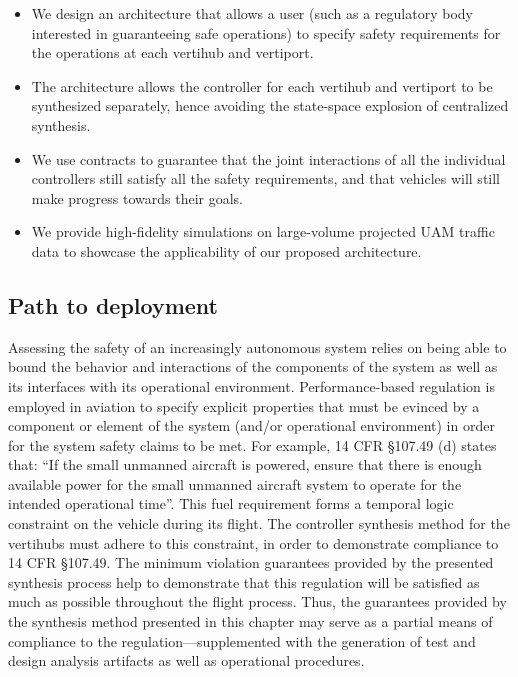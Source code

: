 \begin{itemize}
	\item We design an architecture that allows a user (such as a regulatory body interested in guaranteeing safe operations) to specify safety requirements for the operations at each vertihub and vertiport. 
	\item The architecture allows the controller for each vertihub and vertiport to be synthesized separately, hence avoiding the state-space explosion of centralized synthesis. 
	\item We use contracts to guarantee that the joint interactions of all the individual controllers still satisfy all the safety requirements, and that vehicles will still make progress towards their goals. 
	\item We provide high-fidelity simulations on large-volume projected UAM traffic data to showcase the applicability of our proposed architecture.
\end{itemize}

\subsection{Path to deployment}

Assessing the safety of an increasingly autonomous system relies on being able to bound the behavior and interactions of the components of the system as well as its interfaces with its operational environment. Performance-based regulation is employed in aviation to specify explicit properties that must be evinced by a component or element of the system (and/or operational environment) in order for the system safety claims to be met.  For example, 14 CFR \S 107.49 (d) states that: “If the small unmanned aircraft is powered, ensure that there is enough available power for the small unmanned aircraft system to operate for the intended operational time”.  This fuel requirement forms a temporal logic constraint on the vehicle during its flight. The controller synthesis method for the vertihubs must adhere to this constraint, in order to demonstrate compliance to 14 CFR \S 107.49.  The minimum violation guarantees provided by the presented synthesis process help to demonstrate that this regulation will be satisfied as much as possible throughout the flight process.  Thus, the guarantees provided by the synthesis method presented in this chapter may serve as a partial means of compliance to the regulation---supplemented with the generation of test and design analysis artifacts as well as operational procedures.

